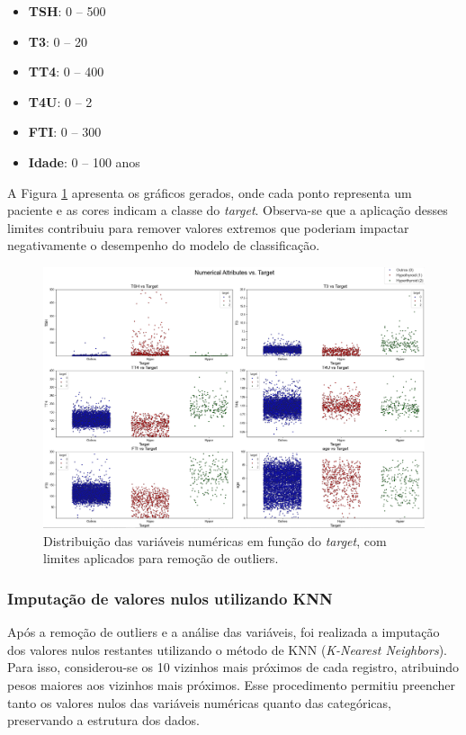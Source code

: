 \documentclass[11pt]{article}
\begin{document}
\begin{itemize}
    \item \textbf{TSH}: 0 -- 500
    \item \textbf{T3}: 0 -- 20
    \item \textbf{TT4}: 0 -- 400
    \item \textbf{T4U}: 0 -- 2
    \item \textbf{FTI}: 0 -- 300
    \item \textbf{Idade}: 0 -- 100 anos
\end{itemize}

A Figura \ref{fig:stripplots} apresenta os gráficos gerados, onde cada ponto representa um paciente e as cores indicam a classe do \textit{target}. Observa-se que a aplicação desses limites contribuiu para remover valores extremos que poderiam impactar negativamente o desempenho do modelo de classificação.

\begin{figure}[H]
    \centering
    \includegraphics[width=1.0\textwidth]{img/numerical_stripplots.png}
    \caption{Distribuição das variáveis numéricas em função do \textit{target}, com limites aplicados para remoção de outliers.}
    \label{fig:stripplots}
\end{figure}

\subsubsection{Imputação de valores nulos utilizando KNN}

Após a remoção de outliers e a análise das variáveis, foi realizada a imputação dos valores nulos restantes utilizando o método de KNN (\textit{K-Nearest Neighbors}). Para isso, considerou-se os 10 vizinhos mais próximos de cada registro, atribuindo pesos maiores aos vizinhos mais próximos. Esse procedimento permitiu preencher tanto os valores nulos das variáveis numéricas quanto das categóricas, preservando a estrutura dos dados.
\end{document}
